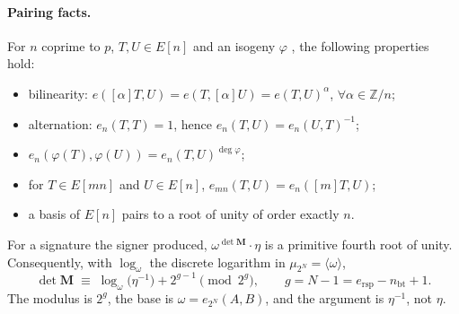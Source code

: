 \documentclass[version=preprint,notanonymous]{iacrcc}
\newcommand{\ers}{e_{\mathrm{rsp}}}
\newcommand{\nbt}{n_{\mathrm{bt}}}
\newcommand{\Mm}{\mathbf{M}}
\newcommand{\Z}{\mathbb{Z}}
\begin{document}
\paragraph{Pairing facts.}
For $n$ coprime to $p$, $T, U \in E[n]$ and an isogeny $\varphi$
\cite[III.8.1 and III.8.2]{silverman}, the following properties hold:
\begin{itemize}
    \item[(W1)] bilinearity: $e([\alpha]T,U) = e(T,[\alpha]U) = e(T,U)^{\alpha}$, $\forall\alpha \in \Z/n$;
    \item[(W2)] alternation: $e_n(T, T) = 1$, hence $e_n(T, U) = e_n(U, T)^{-1}$;
    \item[(W3)] $e_n(\varphi(T), \varphi(U)) = e_n(T, U)^{\deg \varphi}$;
    \item[(W4)] for $T \in E[mn]$ and $U \in E[n]$, $e_{mn}(T, U) = e_n([m] T, U)$;
    \item[(W5)] a basis of $E[n]$ pairs to a root of unity of order exactly $n$.
\end{itemize}

\begin{theorem}
\label{thm:main}
For a signature the signer produced, $\omega^{\det \Mm} \cdot \eta$ is a
primitive fourth root of unity. Consequently, with $\log_\omega$ the
discrete logarithm in $\mu_{2^N} = \langle \omega \rangle$,
\[
  \det \Mm \;\equiv\; \log_{\omega}\bigl(\eta^{-1}\bigr) + 2^{g - 1}
  \pmod{2^{g}}, \qquad g = N - 1 = \ers - \nbt + 1.
\]
The modulus is $2^g$, the base is $\omega = e_{2^N}(A, B)$, and the
argument is $\eta^{-1}$, not $\eta$.
\end{theorem}
\end{document}
